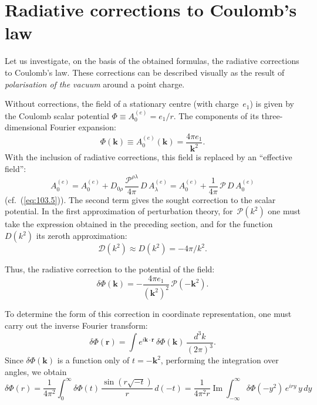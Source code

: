 
\section{Radiative corrections to Coulomb's law}


Let us investigate, on the basis of the obtained formulas, the radiative corrections to Coulomb's law. These corrections can be described visually as the result of \emph{polarisation of the vacuum} around a point charge.

Without corrections, the field of a stationary centre (with charge~$e_1$) is given by the Coulomb scalar potential $\Phi \equiv A_0^{(e)} = e_1/r$. The components of its three-dimensional Fourier expansion:
\[
\Phi(\mathbf{k}) \equiv A_0^{(e)}(\mathbf{k}) = \frac{4\pi e_1}{\mathbf{k}^2}.
\]
With the inclusion of radiative corrections, this field is replaced by an ``effective field'':
\begin{equation}
A_0^{(e)} = A_0^{(e)} + D_{0\rho}\,\frac{\mathcal{P}^{\rho\lambda}}{4\pi}\,D\,A_\lambda^{(e)}
= A_0^{(e)} + \frac{1}{4\pi}\,\mathcal{P}\,D\,A_0^{(e)}
\label{eq:114.1}
\end{equation}
(cf.~(\ref{eq:103.5})). The second term gives the sought correction to the scalar potential. In the first approximation of perturbation theory, for~$\mathcal{P}(k^2)$ one must take the expression obtained in the preceding section, and for the function~$D(k^2)$ its zeroth approximation:
\[
\mathcal{D}(k^2) \approx D(k^2) = -4\pi/k^2.
\]


Thus, the radiative correction to the potential of the field:
\begin{equation}
\delta\Phi(\mathbf{k}) = -\frac{4\pi e_1}{(\mathbf{k}^2)^2}\,\mathcal{P}(-\mathbf{k}^2).
\label{eq:114.2}
\end{equation}

To determine the form of this correction in coordinate representation, one must carry out the inverse Fourier transform:
\begin{equation}
\delta\Phi(\mathbf{r}) = \int e^{i\mathbf{k}\cdot\mathbf{r}}\,\delta\Phi(\mathbf{k})\,\frac{d^3k}{(2\pi)^3}.
\label{eq:114.3}
\end{equation}
Since $\delta\Phi(\mathbf{k})$ is a function only of $t = -\mathbf{k}^2$, performing the integration over angles, we obtain
\[
\delta\Phi(r) = \frac{1}{4\pi^2}\int_0^\infty \delta\Phi(t)\,\frac{\sin(r\sqrt{-t})}{r}\,d(-t)
= \frac{1}{4\pi^2 r}\operatorname{Im}\int_{-\infty}^{\infty}\delta\Phi(-y^2)\,e^{iry}\,y\,dy
\]

